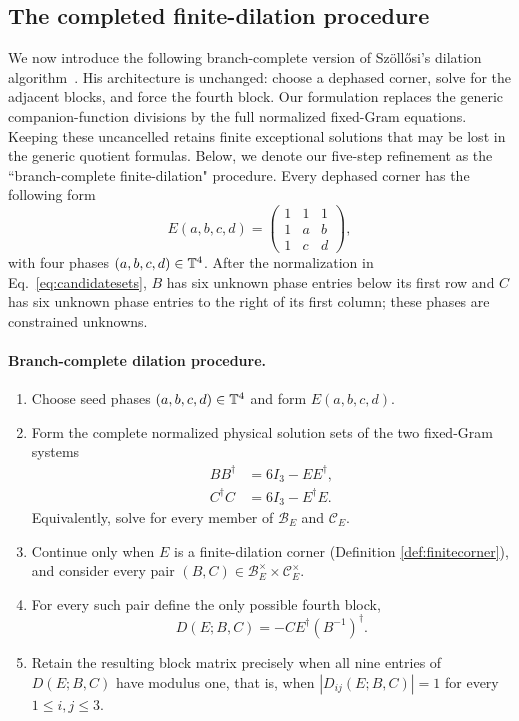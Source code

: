 \subsection{The completed finite-dilation procedure}
\label{sec:dilation}
We now introduce the following branch-complete version of Sz\"oll\H{o}si's dilation algorithm~\cite{Szollosi2012FourParameter}.
His architecture is unchanged: choose a dephased corner, solve for the adjacent blocks, and force the fourth block. Our formulation replaces the generic companion-function divisions by the full normalized fixed-Gram equations. 
Keeping these uncancelled retains finite exceptional solutions that may be lost in the generic quotient formulas. Below, we denote our five-step refinement as the ``branch-complete finite-dilation" procedure.
Every dephased corner has the following form
\begin{equation}
E(a,b,c,d)=
\begin{pmatrix}
1&1&1\\
1&a&b\\
1&c&d
\end{pmatrix},
\label{eq:singular-corner-form}
\end{equation}
with four phases $(a,b,c,d)\in\mathbb T^4$. After the normalization in Eq.~\eqref{eq:candidatesets}, $B$ has six unknown phase entries below its first row and $C$ has six unknown phase entries to the right of its first column; these phases are constrained unknowns.

\paragraph*{Branch-complete dilation procedure.}
\begin{enumerate}
\item Choose seed phases $(a,b,c,d)\in\mathbb T^4$ and form $E(a,b,c,d)$.
\item Form the complete normalized physical solution sets of the two fixed-Gram systems
\begin{equation}
\begin{aligned}
BB^{\dagger}&=6I_3-EE^{\dagger},\\
C^{\dagger}C&=6I_3-E^{\dagger}E.
\end{aligned}
\label{eq:algorithmgrams}
\end{equation}
Equivalently, solve for every member of $\mathcal B_E$ and $\mathcal C_E$.
\item Continue only when $E$ is a finite-dilation corner (Definition \ref{def:finitecorner}), and consider every pair
\hbox{$(B,C)\in\mathcal B_E^\times\times\mathcal C_E^\times$}.
\item For every such pair define the only possible fourth block,
\begin{equation}
D(E;B,C)=-CE^{\dagger}(B^{-1})^{\dagger}.
\label{eq:maincompletionformula}
\end{equation}
\item Retain the resulting block matrix precisely when all nine entries of $D(E;B,C)$ have modulus one, that is, when $|D_{ij}(E;B,C)|=1$ for every
$1\leq i,j\leq3$.
\end{enumerate}


